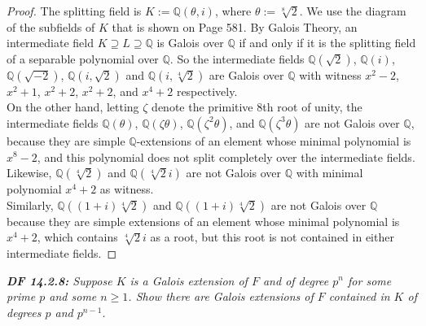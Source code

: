 \documentclass{article}
\begin{document}
  \begin{proof}
    The splitting field is $K:=\mathbb{Q}(\theta,i)$, where
    $\theta:=\sqrt[8]{2}$. We use the diagram of the subfields of $K$ that
    is shown on Page 581. By Galois Theory, an intermediate field
    $K\supseteq L\supseteq\mathbb{Q}$ is Galois over $\mathbb{Q}$ if and
    only if it is the splitting field of a separable polynomial over
    $\mathbb{Q}$. So the intermediate fields $\mathbb{Q}(\sqrt{2})$,
    $\mathbb{Q}(i)$, $\mathbb{Q}(\sqrt{-2})$, $\mathbb{Q}(i,\sqrt{2})$ and
    $\mathbb{Q}(i,\sqrt[4]{2})$ are Galois over
    $\mathbb{Q}$ with witness $x^2-2$, $x^2+1$, $x^2+2$, $x^2+2$, and
    $x^4+2$ respectively. \\

    On the other hand, letting $\zeta$ denote the primitive 8th root of
    unity, the intermediate fields $\mathbb{Q}(\theta)$,
    $\mathbb{Q}(\zeta\theta)$, $\mathbb{Q}(\zeta^2\theta)$, and
    $\mathbb{Q}(\zeta^3\theta)$ are not Galois over $\mathbb{Q}$, because
    they are simple $\mathbb{Q}$-extensions of an element whose minimal
    polynomial is $x^8-2$, and this polynomial does not split completely
    over the intermediate fields. Likewise, $\mathbb{Q}(\sqrt[4]{2})$ and
    $\mathbb{Q}(\sqrt[4]{2}i)$ are not Galois over $\mathbb{Q}$ with
    minimal polynomial $x^4+2$ as witness. \\

    Similarly, $\mathbb{Q}((1+i)\sqrt[4]{2})$ and
    $\mathbb{Q}((1+i)\sqrt[4]{2})$ are not Galois over $\mathbb{Q}$ because
    they are simple extensions of an element whose minimal polynomial is
    $x^4+2$, which contains $\sqrt[4]{2}i$ as a root, but this root is not
    contained in either intermediate fields.
  \end{proof}

\it \textbf{DF 14.2.8:} Suppose $K$ is a Galois extension of $F$ and of
  degree $p^n$ for some prime $p$ and some $n\geq1$. Show there are Galois
  extensions of $F$ contained in $K$ of degrees $p$ and $p^{n-1}$.
\end{document}
